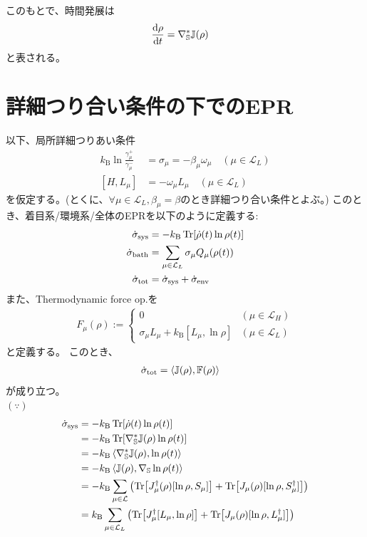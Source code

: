 \documentclass[a4paper,11pt]{jsarticle}
\numberwithin{equation}{section}
\begin{document}
このもとで、時間発展は
\begin{align}
    \dv{\rho}{t} &= \nabla^*_{\mathbb{S}} \mathbb{J}(\rho)
\end{align}
と表される。

\section{詳細つり合い条件の下でのEPR}
以下、局所詳細つりあい条件
\begin{align}
    k_{\text{B}} \ln \frac{\gamma_{\mu}^{+}}{\gamma_{\mu}^{-}} &= \sigma_{\mu}= -\beta_{\mu} \omega_{\mu} \quad (\mu \in \mathcal{L}_{L})\\
    [H,L_{\mu}] &= -\omega_{\mu} L_{\mu} \quad (\mu \in \mathcal{L}_{L})
\end{align}
を仮定する。(とくに、$\forall \mu \in \mathcal{L}_{L}, \beta_{\mu} = \beta$のとき詳細つり合い条件とよぶ。)
このとき、着目系/環境系/全体のEPRを以下のように定義する:
\begin{align}
    \dot{\sigma}_{\text{sys}} &= -k_{\text{B}} \Tr[ \dot{\rho}(t) \ln \rho(t)] \\
    \dot{\sigma}_{\text{bath}} &= \sum_{\mu \in \mathcal{L}_{L}} \sigma_{\mu} Q_{\mu}(\rho(t)) \\
    \dot{\sigma}_{\text{tot}} &= \dot{\sigma}_{\text{sys}} + \dot{\sigma}_{\text{env}}
\end{align}
また、Thermodynamic force op.を
\begin{align}
    F_{\mu}(\rho) 
    :=
    \begin{cases}
        0 & (\mu \in \mathcal{L}_{H}) \\
        \sigma_{\mu} L_{\mu} + k_{\text{B}}[L_{\mu}, \ln \rho] & (\mu \in \mathcal{L}_{L})
    \end{cases}
\end{align}
と定義する。
このとき、
\begin{align}
    \dot{\sigma}_{\text{tot}} &= \ev{ \mathbb{J}(\rho) , \mathbb{F}(\rho) }
\end{align}
が成り立つ。\\
$(\because)$\\
\begin{align}
    \dot{\sigma}_{\text{sys}} &= -k_{\text{B}} \Tr[ \dot{\rho}(t) \ln \rho(t)] \\
    &= -k_{\text{B}} \Tr[ \nabla^*_{\mathbb{S}} \mathbb{J}(\rho) \ln \rho(t)] \\
    &= -k_{\text{B}} \ev{ \nabla^*_{\mathbb{S}}  \mathbb{J}(\rho) , \ln \rho(t)} \\
    &= -k_{\text{B}} \ev{  \mathbb{J}(\rho) , \nabla_{\mathbb{S}} \ln \rho(t)} \\
    &= -k_{\text{B}} \sum_{\mu \in \mathcal{L}} \qty( \Tr[ J_{\mu}^{\dagger}(\rho) [\ln \rho, S_{\mu}] ] + \Tr[ J_{\mu}(\rho) [\ln \rho, S_{\mu}^{\dagger}] ]) \\
    &= k_{\text{B}} \sum_{\mu \in \mathcal{L}_{L}} \qty( \Tr[ J_{\mu}^{\dagger}[L_{\mu}, \ln \rho] ] + \Tr[ J_{\mu}(\rho) [\ln \rho, L_{\mu}^{\dagger}] ]) 
\end{align}
\end{document}
